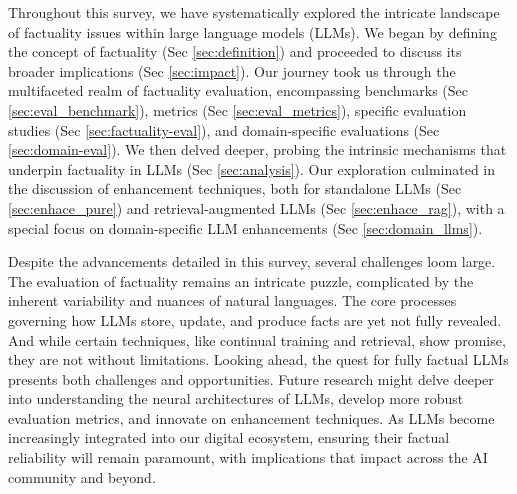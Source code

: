 Throughout this survey, we have systematically explored the intricate landscape of factuality issues within large language models (LLMs). We began by defining the concept of factuality (Sec \ref{sec:definition}) and proceeded to discuss its broader implications (Sec \ref{sec:impact}). Our journey took us through the multifaceted realm of factuality evaluation, encompassing benchmarks (Sec \ref{sec:eval_benchmark}), metrics (Sec \ref{sec:eval_metrics}), specific evaluation studies (Sec \ref{sec:factuality-eval}), and domain-specific evaluations (Sec \ref{sec:domain-eval}). We then delved deeper, probing the intrinsic mechanisms that underpin factuality in LLMs (Sec \ref{sec:analysis}). Our exploration culminated in the discussion of enhancement techniques, both for standalone LLMs (Sec \ref{sec:enhace_pure}) and retrieval-augmented LLMs (Sec \ref{sec:enhace_rag}), with a special focus on domain-specific LLM enhancements (Sec \ref{sec:domain_llms}).

Despite the advancements detailed in this survey, several challenges loom large. The evaluation of factuality remains an intricate puzzle, complicated by the inherent variability and nuances of natural languages. The core processes governing how LLMs store, update, and produce facts are yet not fully revealed. And while certain techniques, like continual training and retrieval, show promise, they are not without limitations.
Looking ahead, the quest for fully factual LLMs presents both challenges and opportunities. Future research might delve deeper into understanding the neural architectures of LLMs, develop more robust evaluation metrics, and innovate on enhancement techniques. As LLMs become increasingly integrated into our digital ecosystem, ensuring their factual reliability will remain paramount, with implications that impact across the AI community and beyond.